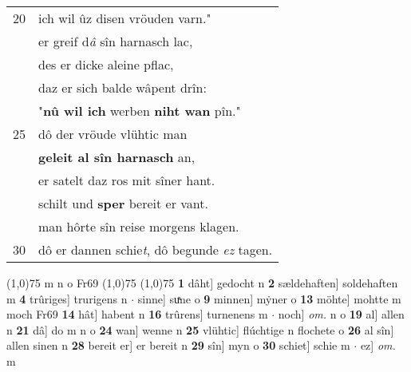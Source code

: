 \documentclass[8pt,a4paper,notitlepage]{article}
\begin{document}
\begin{table}[ht]
\begin{minipage}[t]{0.5\linewidth}
\begin{tabular}{rl}
20 & ich wil ûz disen vröuden varn."\\ 
 & er greif d\textit{â} sîn harnasch lac,\\ 
 & des er dicke aleine pflac,\\ 
 & daz er sich balde wâpent drîn:\\ 
 & "\textbf{nû wil ich} werben \textbf{niht wan} pîn."\\ 
25 & dô der vröude vlühtic man\\ 
 & \textbf{geleit al sîn harnasch} an,\\ 
 & er satelt daz ros mit sîner hant.\\ 
 & schilt und \textbf{sper} bereit er vant.\\ 
 & man hôrte sîn reise morgens klagen.\\ 
30 & dô er dannen schie\textit{t}, dô begunde \textit{ez} tagen.\\ 
\end{tabular}
\scriptsize
\line(1,0){75} \newline
m n o Fr69 \newline
\line(1,0){75} \newline
\newline
\line(1,0){75} \newline
\textbf{1} dâht] gedocht n \textbf{2} sældehaften] soldehaften m \textbf{4} trûriges] trurigens n  $\cdot$ sinne] suͯne o \textbf{9} minnen] mẏner o \textbf{13} möhte] mohtte m moch Fr69 \textbf{14} hât] habent n \textbf{16} trûrens] turnenens m  $\cdot$ noch] \textit{om.} n o \textbf{19} al] allen n \textbf{21} dâ] do m n o \textbf{24} wan] wenne n \textbf{25} vlühtic] flúchtige n flochete o \textbf{26} al sîn] allen sinen n \textbf{28} bereit er] er bereit n \textbf{29} sîn] myn o \textbf{30} schiet] schie m  $\cdot$ ez] \textit{om.} m \newline
\end{minipage}
\end{table}
\newpage
\end{document}
